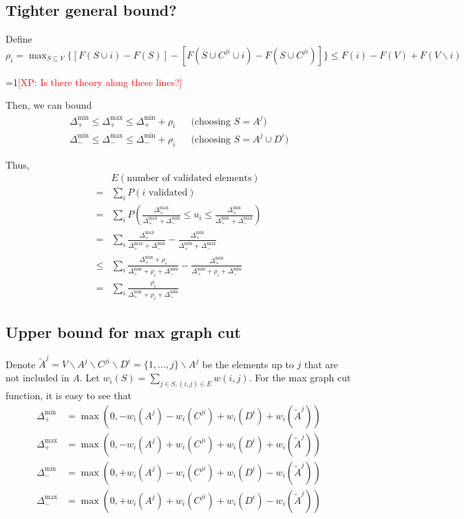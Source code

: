 \documentclass{article} %
\newcommand{\Comments}{1}
\newcommand{\note}[2]{\ifnum\Comments=1\textcolor{#1}{#2}\fi}
\newcommand{\xinghao}[1]{\note{red}{[XP: #1]}}
\begin{document}
\subsection{Tighter general bound?}
Define $\rho_i = \max_{S\subseteq V} \{[F(S\cup i) - F(S)] - [F(S \cup C^{ji} \cup i) - F(S \cup C^{ji})]\} \leq F(i) - F(V) + F(V\backslash i)$

\xinghao{Is there theory along these lines?}

Then, we can bound
\begin{align*}
\Delta_+^{\min} \leq \Delta_+^{\max} \leq \Delta_+^{\min} + \rho_i && \text{(choosing $S=A^j$)}\\
\Delta_-^{\min} \leq \Delta_-^{\max} \leq \Delta_-^{\min} + \rho_i && \text{(choosing $S=A^j\cup D^i$)}
\end{align*}

Thus,
\begin{align*}
&E(\text{number of validated elements})\\
=& \sum_i P(i \text{ validated})\\
=& \sum_i P\left(\frac{\Delta_+^{\max}}{\Delta_+^{\max} + \Delta_-^{\min}} \leq u_i \leq \frac{\Delta_+^{\min}}{\Delta_+^{\min} + \Delta_-^{\max}}\right)\\
=& \sum_i\frac{\Delta_+^{\max}}{\Delta_+^{\max} + \Delta_-^{\min}} - \frac{\Delta_+^{\min}}{\Delta_+^{\min} + \Delta_-^{\max}}\\
\leq& \sum_i\frac{\Delta_+^{\min}+\rho_i}{\Delta_+^{\min} + \rho_i + \Delta_-^{\min}} - \frac{\Delta_+^{\min}}{\Delta_+^{\min} + \rho_i + \Delta_-^{\min}}\\
=& \sum_i\frac{\rho_i}{\Delta_+^{\min} + \rho_i + \Delta_-^{\min}}
\end{align*}




\subsection{Upper bound for max graph cut}
Denote $\tilde{A}^j = V\backslash A^j\backslash C^{ji}\backslash D^i = \{1,\dots,j\}\backslash A^j$ be the elements up to $j$ that are not included in $A$.
Let $w_i(S) = \sum_{j\in S, (i,j)\in E} w(i,j)$.
For the max graph cut function, it is easy to see that 
\begin{align*}
\Delta_+^{\min} &= \max(0, - w_i(A^j) -w_i(C^{ji}) + w_i(D^i) + w_i(\tilde{A}^j))\\
\Delta_+^{\max} &= \max(0, - w_i(A^j) + w_i(C^{ji}) + w_i(D^i) + w_i(\tilde{A}^j))\\
\Delta_-^{\min} &= \max(0, + w_i(A^j) - w_i(C^{ji}) + w_i(D^i) - w_i(\tilde{A}^j))\\
\Delta_-^{\max} &= \max(0, + w_i(A^j) + w_i(C^{ji}) + w_i(D^i) - w_i(\tilde{A}^j))
\end{align*}
\end{document}
